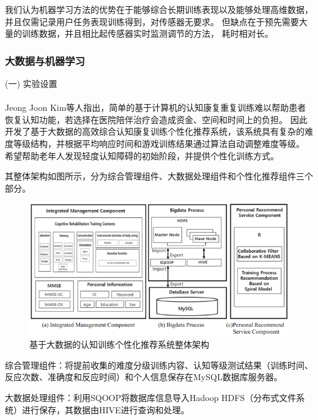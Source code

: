 \documentclass[12pt]{article}
\begin{document}
            我们认为机器学习方法的优势在于能够综合长期训练表现以及能够处理高维数据，
            并且仅需记录用户任务表现训练得到，对传感器无要求。
            但缺点在于预先需要大量的训练数据，并且相比起传感器实时监测调节的方法，
            耗时相对长。

            \subsubsection{大数据与机器学习}
            (一) 实验设置\paragraph{}
            Jeong Joon Kim\cite{ref11}等人指出，简单的基于计算机的认知康复重复训练难以帮助患者恢复认知功能，若选择在医院陪伴治疗会造成资金、空间和时间上的负担。
            因此开发了基于大数据的高效综合认知康复训练个性化推荐系统，该系统具有复杂的难度等级结构，并根据平均响应时间和游戏训练结果通过算法自动调整难度等级。
            希望帮助老年人发现轻度认知障碍的初始阶段，并提供个性化训练方式。

            其整体架构如图所示，分为综合管理组件、大数据处理组件和个性化推荐组件三个部分。
            \begin{figure}[H]
            	
            	\centering
            	\includegraphics[scale=0.7]{images/Overall_architecture.png}
            	\caption{基于大数据的认知训练个性化推荐系统整体架构}
            	\label{fig:label}
            \end{figure}

            综合管理组件：将提前收集的难度分级训练内容、认知等级测试结果（训练时间、反应次数、准确度和反应时间）和个人信息保存在MySQL数据库服务器。
 
            大数据处理组件：利用SQOOP将数据库信息导入Hadoop HDFS（分布式文件系统）进行保存，其数据由HIVE进行查询和处理。
\end{document}

